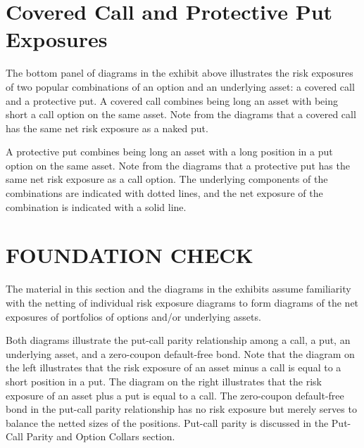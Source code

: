\documentclass[11pt]{article}
\begin{document}
\section*{Covered Call and Protective Put Exposures}
The bottom panel of diagrams in the exhibit above illustrates the risk exposures of two popular combinations of an option and an underlying asset: a covered call and a protective put. A covered call combines being long an asset with being short a call option on the same asset. Note from the diagrams that a covered call has the same net risk exposure as a naked put.

A protective put combines being long an asset with a long position in a put option on the same asset. Note from the diagrams that a protective put has the same net risk exposure as a call option. The underlying components of the combinations are indicated with dotted lines, and the net exposure of the combination is indicated with a solid line.

\section*{FOUNDATION CHECK}
The material in this section and the diagrams in the exhibits assume familiarity with the netting of individual risk exposure diagrams to form diagrams of the net exposures of portfolios of options and/or underlying assets.

Both diagrams illustrate the put-call parity relationship among a call, a put, an underlying asset, and a zero-coupon default-free bond. Note that the diagram on the left illustrates that the risk exposure of an asset minus a call is equal to a short position in a put. The diagram on the right illustrates that the risk exposure of an asset plus a put is equal to a call. The zero-coupon default-free bond in the put-call parity relationship has no risk exposure but merely serves to balance the netted sizes of the positions. Put-call parity is discussed in the Put-Call Parity and Option Collars section.
\end{document}
